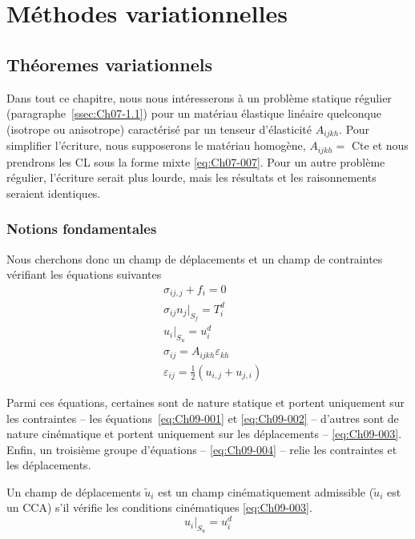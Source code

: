 \chapter{Méthodes variationnelles} \label{chap:Ch09}
\section{Théoremes variationnels} \label{sec:Ch09-1}
Dans tout ce chapitre, nous nous intéresserons à un problème statique régulier (paragraphe~\ref{ssec:Ch07-1.1}) pour un matériau élastique linéaire quelconque (isotrope ou anisotrope) caractérisé par un tenseur d'élasticité $A_{ijkh}$.
Pour simplifier l'écriture, nous supposerons le matériau homogène, $A_{ijkh} =$ Cte et nous prendrons les CL sous la forme mixte \eqref{eq:Ch07-007}.
Pour un autre problème régulier, l'écriture serait plus lourde, mais les résultats et les raisonnements seraient identiques.

\subsection{Notions fondamentales} \label{ssec:Ch09-1.1}
Nous cherchons donc un champ de déplacements et un champ de contraintes vérifiant les équations suivantes
\begin{align}
    & \sigma_{ij,j} + f_i = 0 \label{eq:Ch09-001} \\
    & \sigma_{ij} n_j |_{S_f} = T_i^d \label{eq:Ch09-002} \\
    & u_i |_{S_u} = u_i^d \label{eq:Ch09-003} \\
    & \sigma_{ij} = A_{ijkh} \varepsilon_{kh} \label{eq:Ch09-004} \\
    & \varepsilon_{ij} = \frac{1}{2} \left( u_{i,j} + u_{j,i} \right) \label{eq:Ch09-005}
\end{align}

Parmi ces équations, certaines sont de nature statique et portent uniquement sur les contraintes -- les équations~\eqref{eq:Ch09-001} et \eqref{eq:Ch09-002} -- d'autres sont de  nature cinématique  et portent uniquement  sur  les déplacements -- \eqref{eq:Ch09-003}.  
Enfin, un troisième groupe d'équations -- \eqref{eq:Ch09-004} -- relie les contraintes et les déplacements.

\begin{deff}
    Un champ de déplacements $\tilde{u}_i$ est un champ cinématiquement admissible ($\tilde{u}_i$ est un CCA) s'il vérifie les conditions cinématiques \eqref{eq:Ch09-003}.
    \begin{equation}
        u_i |_{S_u} = u_i^d
        \label{eq:Ch09-006}
    \end{equation}
\end{deff}

